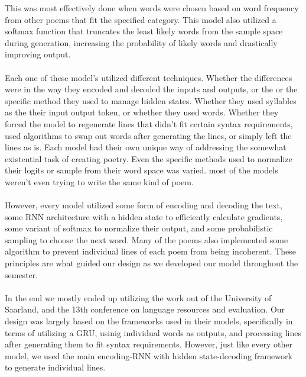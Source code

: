 \documentclass{article} %
\begin{document}
This was most effectively done when words were chosen based on word frequency from other poems that fit the specified category.
This model also utilized a softmax function that truncates the least likely words from the sample space during generation, increasing the probability of likely words and drastically improving output.\\\\
Each one of these model's utilized different techniques. Whether the differences were in the way they encoded and decoded the inputs and outputs, or the or the specific method they used to manage hidden states. Whether they used syllables as the their input output token, or whether they used words. Whether they forced the model to regenerate lines that didn't fit certain syntax requirements, used algorithms to swap out words after generating the lines, or simply left the lines as is. Each model had their own unique way of addressing the somewhat existential task of creating poetry. Even the specific methods used to normalize their logits or sample from their word space was varied. most of the models weren't even trying to write the same kind of poem.\\\\
However, every model utilized some form of encoding and decoding the text, some RNN architecture with a hidden state to efficiently calculate gradients, some variant of softmax to normalize their output, and some probabilistic sampling to choose the next word. Many of the poems also implemented some algorithm to prevent individual lines of each poem from being incoherent. These principles are what guided our design as we developed our model throughout the semester.\\\\
In the end we mostly ended up utilizing the work out of the University of Saarland, and the 13th conference on language resources and evaluation. Our design was largely based on the frameworks used in their models, specifically in terms of utilizing a GRU, usinig individual words as outputs, and processing lines after generating them to fit syntax requirements. However, just like every other model, we used the main encoding-RNN with hidden state-decoding framework to generate individual lines.
\end{document}

